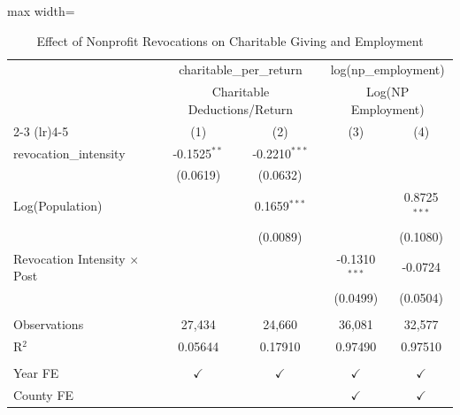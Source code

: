 
\begin{table}[htbp]
   \caption{\label{tab:giving_employment} Effect of Nonprofit Revocations on Charitable Giving and Employment}
   \bigskip
   \centering
   \begin{adjustbox}{max width=\textwidth}
   \begin{tabular}{lcccc}
      \toprule
       & \multicolumn{2}{c}{charitable\_per\_return} & \multicolumn{2}{c}{log(np\_employment)}\\
       & \multicolumn{2}{c}{Charitable Deductions/Return} & \multicolumn{2}{c}{Log(NP Employment)} \\ \cmidrule(lr){2-3} \cmidrule(lr){4-5}
                                          & (1)            & (2)             & (3)             & (4)\\  
      \midrule 
      revocation\_intensity               & -0.1525$^{**}$ & -0.2210$^{***}$ &                 &   \\   
                                          & (0.0619)       & (0.0632)        &                 &   \\   
      Log(Population)                     &                & 0.1659$^{***}$  &                 & 0.8725$^{***}$\\   
                                          &                & (0.0089)        &                 & (0.1080)\\   
      Revocation Intensity $\times$ Post  &                &                 & -0.1310$^{***}$ & -0.0724\\   
                                          &                &                 & (0.0499)        & (0.0504)\\   
       \\
      Observations                        & 27,434         & 24,660          & 36,081          & 32,577\\  
      R$^2$                               & 0.05644        & 0.17910         & 0.97490         & 0.97510\\  
       \\
      Year FE                             & $\checkmark$   & $\checkmark$    & $\checkmark$    & $\checkmark$\\   
      County FE                           &                &                 & $\checkmark$    & $\checkmark$\\   
      \bottomrule
   \end{tabular}
   \end{adjustbox}
\end{table}


